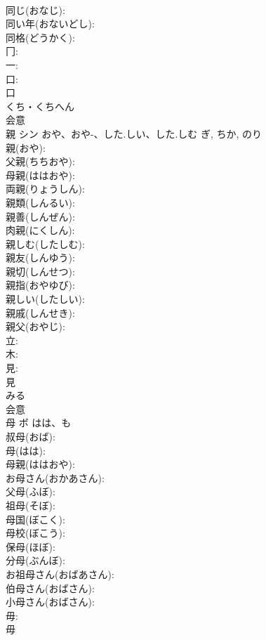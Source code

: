 \documentclass[8pt]{extreport}
\begin{document}
\begin{CJK}{UTF8}{min}
\\	同じ(おなじ): 
\\	同い年(おないどし): 
\\	同格(どうかく): 
\\	冂: 
\\	一: 
\\	口: 
\\	口	
\\	くち・くちへん	
\\	会意 
\\	親	シン	おや、おや-、した.しい、した.しむ	ぎ, ちか, のり	
\\	親(おや): 
\\	父親(ちちおや): 
\\	母親(ははおや): 
\\	両親(りょうしん): 
\\	親類(しんるい): 
\\	親善(しんぜん): 
\\	肉親(にくしん): 
\\	親しむ(したしむ): 
\\	親友(しんゆう): 
\\	親切(しんせつ): 
\\	親指(おやゆび): 
\\	親しい(したしい): 
\\	親戚(しんせき): 
\\	親父(おやじ): 
\\	立: 
\\	木: 
\\	見: 
\\	見	
\\	みる	
\\	会意 
\\	母	ボ	はは、も		
\\	叔母(おば): 
\\	母(はは): 
\\	母親(ははおや): 
\\	お母さん(おかあさん): 
\\	父母(ふぼ): 
\\	祖母(そぼ): 
\\	母国(ぼこく): 
\\	母校(ぼこう): 
\\	保母(ほぼ): 
\\	分母(ぶんぼ): 
\\	お祖母さん(おばあさん): 
\\	伯母さん(おばさん): 
\\	小母さん(おばさん): 
\\	毋: 
\\	毋	

\end{CJK}
\end{document}
